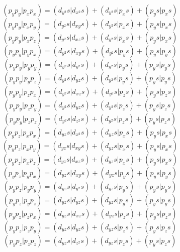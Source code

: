 \documentclass{article}
\begin{document}
\[  ( p_ { y } p_ { y } | p_ { x } p_ { x } ) = ( d_ { y^2 } s | d_ { x^2 } s ) + ( d_ { y^2 } s | p_ { x } s ) + ( p_ { y } s | p_ { x } s )  \]
\[  ( p_ { y } p_ { y } | p_ { x } p_ { y } ) = ( d_ { y^2 } s | d_ { x y } s ) + ( d_ { y^2 } s | p_ { x } s ) + ( p_ { y } s | p_ { x } s )  \]
\[  ( p_ { y } p_ { y } | p_ { x } p_ { z } ) = ( d_ { y^2 } s | d_ { x z } s ) + ( d_ { y^2 } s | p_ { x } s ) + ( p_ { y } s | p_ { x } s )  \]
\[  ( p_ { y } p_ { y } | p_ { y } p_ { x } ) = ( d_ { y^2 } s | d_ { x y } s ) + ( d_ { y^2 } s | p_ { y } s ) + ( p_ { y } s | p_ { y } s )  \]
\[  ( p_ { y } p_ { y } | p_ { y } p_ { y } ) = ( d_ { y^2 } s | d_ { y^2 } s ) + ( d_ { y^2 } s | p_ { y } s ) + ( p_ { y } s | p_ { y } s )  \]
\[  ( p_ { y } p_ { y } | p_ { y } p_ { z } ) = ( d_ { y^2 } s | d_ { y z } s ) + ( d_ { y^2 } s | p_ { y } s ) + ( p_ { y } s | p_ { y } s )  \]
\[  ( p_ { y } p_ { y } | p_ { z } p_ { x } ) = ( d_ { y^2 } s | d_ { x z } s ) + ( d_ { y^2 } s | p_ { z } s ) + ( p_ { y } s | p_ { z } s )  \]
\[  ( p_ { y } p_ { y } | p_ { z } p_ { y } ) = ( d_ { y^2 } s | d_ { y z } s ) + ( d_ { y^2 } s | p_ { z } s ) + ( p_ { y } s | p_ { z } s )  \]
\[  ( p_ { y } p_ { y } | p_ { z } p_ { z } ) = ( d_ { y^2 } s | d_ { z^2 } s ) + ( d_ { y^2 } s | p_ { z } s ) + ( p_ { y } s | p_ { z } s )  \]
\[  ( p_ { y } p_ { z } | p_ { x } p_ { x } ) = ( d_ { y z } s | d_ { x^2 } s ) + ( d_ { y z } s | p_ { x } s ) + ( p_ { y } s | p_ { x } s )  \]
\[  ( p_ { y } p_ { z } | p_ { x } p_ { y } ) = ( d_ { y z } s | d_ { x y } s ) + ( d_ { y z } s | p_ { x } s ) + ( p_ { y } s | p_ { x } s )  \]
\[  ( p_ { y } p_ { z } | p_ { x } p_ { z } ) = ( d_ { y z } s | d_ { x z } s ) + ( d_ { y z } s | p_ { x } s ) + ( p_ { y } s | p_ { x } s )  \]
\[  ( p_ { y } p_ { z } | p_ { y } p_ { x } ) = ( d_ { y z } s | d_ { x y } s ) + ( d_ { y z } s | p_ { y } s ) + ( p_ { y } s | p_ { y } s )  \]
\[  ( p_ { y } p_ { z } | p_ { y } p_ { y } ) = ( d_ { y z } s | d_ { y^2 } s ) + ( d_ { y z } s | p_ { y } s ) + ( p_ { y } s | p_ { y } s )  \]
\[  ( p_ { y } p_ { z } | p_ { y } p_ { z } ) = ( d_ { y z } s | d_ { y z } s ) + ( d_ { y z } s | p_ { y } s ) + ( p_ { y } s | p_ { y } s )  \]
\[  ( p_ { y } p_ { z } | p_ { z } p_ { x } ) = ( d_ { y z } s | d_ { x z } s ) + ( d_ { y z } s | p_ { z } s ) + ( p_ { y } s | p_ { z } s )  \]
\[  ( p_ { y } p_ { z } | p_ { z } p_ { y } ) = ( d_ { y z } s | d_ { y z } s ) + ( d_ { y z } s | p_ { z } s ) + ( p_ { y } s | p_ { z } s )  \]
\[  ( p_ { y } p_ { z } | p_ { z } p_ { z } ) = ( d_ { y z } s | d_ { z^2 } s ) + ( d_ { y z } s | p_ { z } s ) + ( p_ { y } s | p_ { z } s )  \]
\end{document}
